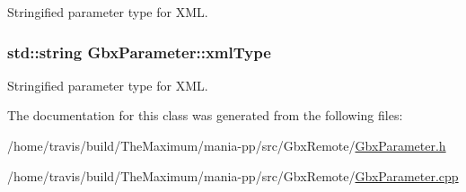 Stringified parameter type for X\-M\-L. 

\hypertarget{classGbxParameter_ad5182c3df0c77e011c61e00e182f8a49}{
\subsubsection[{xml\-Type}]{\setlength{\rightskip}{0pt plus 5cm}std\-::string Gbx\-Parameter\-::xml\-Type\hspace{0.3cm}{\ttfamily [private]}}}\label{classGbxParameter_ad5182c3df0c77e011c61e00e182f8a49}


Stringified parameter type for X\-M\-L. 



The documentation for this class was generated from the following files\-:\begin{DoxyCompactItemize}
\item 
/home/travis/build/\-The\-Maximum/mania-\/pp/src/\-Gbx\-Remote/\hyperlink{GbxParameter_8h}{Gbx\-Parameter.\-h}\item 
/home/travis/build/\-The\-Maximum/mania-\/pp/src/\-Gbx\-Remote/\hyperlink{GbxParameter_8cpp}{Gbx\-Parameter.\-cpp}\end{DoxyCompactItemize}
